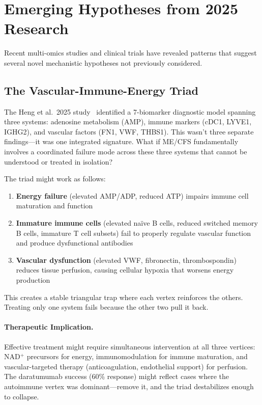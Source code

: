 \section{Emerging Hypotheses from 2025 Research}
\label{sec:2025-hypotheses}

Recent multi-omics studies and clinical trials have revealed patterns that suggest several novel mechanistic hypotheses not previously considered.

\subsection{The Vascular-Immune-Energy Triad}

\begin{open_question}
The Heng et al.\ 2025 study~\cite{heng2025mecfs} identified a 7-biomarker diagnostic model spanning three systems: adenosine metabolism (AMP), immune markers (cDC1, LYVE1, IGHG2), and vascular factors (FN1, VWF, THBS1). This wasn't three separate findings---it was one integrated signature. What if ME/CFS fundamentally involves a coordinated failure mode across these three systems that cannot be understood or treated in isolation?

The triad might work as follows:
\begin{enumerate}
    \item \textbf{Energy failure} (elevated AMP/ADP, reduced ATP) impairs immune cell maturation and function
    \item \textbf{Immature immune cells} (elevated na\"ive B cells, reduced switched memory B cells, immature T cell subsets) fail to properly regulate vascular function and produce dysfunctional antibodies
    \item \textbf{Vascular dysfunction} (elevated VWF, fibronectin, thrombospondin) reduces tissue perfusion, causing cellular hypoxia that worsens energy production
\end{enumerate}

This creates a stable triangular trap where each vertex reinforces the others. Treating only one system fails because the other two pull it back.
\end{open_question}

\paragraph{Therapeutic Implication.} Effective treatment might require simultaneous intervention at all three vertices: NAD$^+$ precursors for energy, immunomodulation for immune maturation, and vascular-targeted therapy (anticoagulation, endothelial support) for perfusion. The daratumumab success (60\% response) might reflect cases where the autoimmune vertex was dominant---remove it, and the triad destabilizes enough to collapse.

